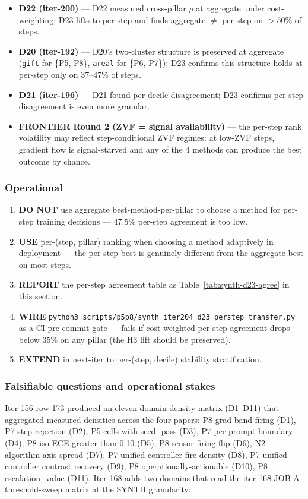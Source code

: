 \documentclass{article}
\begin{document}
\begin{itemize}
\item \textbf{D22 (iter-200)} --- D22 measured cross-pillar $\rho$ at
  aggregate under cost-weighting; D23 lifts to per-step and finds
  aggregate $\neq$ per-step on $> 50\%$ of steps.
\item \textbf{D20 (iter-192)} --- D20's two-cluster structure is preserved
  at aggregate (\texttt{gift} for \{P5, P8\}, \texttt{areal} for \{P6, P7\});
  D23 confirms this structure holds at per-step only on 37--47\% of steps.
\item \textbf{D21 (iter-196)} --- D21 found per-decile disagreement;
  D23 confirms per-step disagreement is even more granular.
\item \textbf{FRONTIER Round 2 (ZVF = signal availability)} --- the
  per-step rank volatility may reflect step-conditional ZVF regimes:
  at low-ZVF steps, gradient flow is signal-starved and any of the
  4 methods can produce the best outcome by chance.
\end{itemize}

\subsubsection{Operational}\label{sec:synth-d23-operational}
\begin{enumerate}
\item \textbf{DO NOT} use aggregate best-method-per-pillar to choose a
  method for per-step training decisions --- 47.5\% per-step agreement
  is too low.
\item \textbf{USE} per-(step, pillar) ranking when choosing a method
  adaptively in deployment --- the per-step best is genuinely different
  from the aggregate best on most steps.
\item \textbf{REPORT} the per-step agreement table as
  Table~\ref{tab:synth-d23-agree} in this section.
\item \textbf{WIRE} \texttt{python3 scripts/p5p8/synth\_iter204\_d23\_perstep\_transfer.py}
  as a CI pre-commit gate --- fails if cost-weighted per-step agreement
  drops below 35\% on any pillar (the H3 lift should be preserved).
\item \textbf{EXTEND} in next-iter to per-(step, decile) stability
  stratification.
\end{enumerate} 

\subsubsection{Falsifiable questions and operational stakes}
Iter-156 row 173 produced an eleven-domain density matrix (D1--D11)
that aggregated measured densities across the four papers: P8
grad-band firing (D1), P7 step rejection (D2), P5 cells-with-seed-
pass (D3), P7 per-prompt boundary (D4), P8 iso-ECE-greater-than-0.10
(D5), P8 sensor-firing flip (D6), N2 algorithm-axis spread (D7), P7
unified-controller fire density (D8), P7 unified-controller contrast
recovery (D9), P8 operationally-actionable (D10), P8 escalation-
value (D11). Iter-168 adds two domains that read the iter-168 JOB A
threshold-sweep matrix at the SYNTH granularity:
\end{document}
